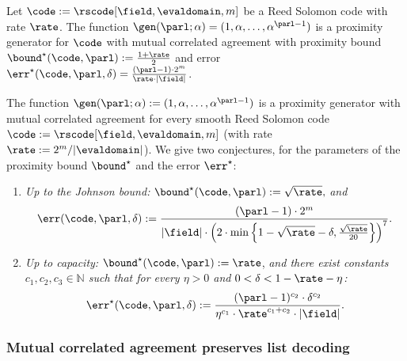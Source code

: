 \begin{lemma}
    Let $\code := \rscode[\field, \evaldomain, m]$ be a Reed Solomon code with rate $\rate$. The function $\gen(\parl; \alpha) = (1, \alpha, \ldots, \alpha^{\parl - 1})$ is a proximity generator for $\code$ with mutual correlated agreement with proximity bound ${\bound}^\star(\code, \parl) := \frac{1 + \rate}{2}$ and error $\err^\star(\code, \parl, \delta) = \frac{(\parl - 1) \cdot 2^m}{\rate \cdot |\field|}$.
\end{lemma}

\begin{theorem}\label{conjecture:whir}
    The function $\gen(\parl; \alpha) := (1, \alpha, \ldots, \alpha^{\parl - 1})$ is a proximity generator with mutual correlated agreement for every smooth Reed Solomon code $\code := \rscode[\field, \evaldomain, m]$ (with rate $\rate := 2^m / |\evaldomain|$). We give two conjectures, for the parameters of the proximity bound ${\bound}^\star$ and the error $\err^\star$:
    \begin{enumerate}
        \item \textit{Up to the Johnson bound:} ${\bound}^\star(\code, \parl) := \sqrt{\rate},$ \textit{and}
        \[
        \err(\code, \parl, \delta) := \frac{(\parl - 1) \cdot 2^m}{|\field| \cdot \left( 2 \cdot \min\left\{1 - \sqrt{\rate} - \delta, \frac{\sqrt{\rate}}{20} \right\} \right)^7}.
        \]
      
        \item \textit{Up to capacity:} ${\bound}^\star(\code, \parl) := \rate$, \textit{and there exist constants $c_1, c_2, c_3 \in \mathbb{N}$ such that for every $\eta > 0$ and $0 < \delta < 1 - \rate - \eta$:}
        \[
        \err^\star(\code, \parl, \delta) := \frac{(\parl - 1)^{c_2} \cdot \delta^{c_2}}{\eta^{c_1} \cdot \rate^{c_1 + c_2} \cdot |\field|}.
        \]
      \end{enumerate}
\end{theorem}

\subsubsection{Mutual correlated agreement preserves list decoding}

